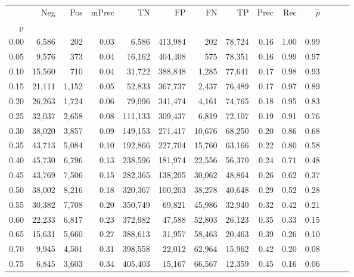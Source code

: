 \begin{tabular}{rrrrrrrrrrrrrr}
\toprule
{} &     Neg &    Pos & mPrec &       TN &       FP &      FN &      TP &  Prec &   Rec & $\hat{p}$ \\
p    &         &        &       &          &          &         &         &       &       &           \\
\midrule
0.00 &   6,586 &    202 &  0.03 &    6,586 &  413,984 &     202 &  78,724 &  0.16 &  1.00 &      0.99 \\
0.05 &   9,576 &    373 &  0.04 &   16,162 &  404,408 &     575 &  78,351 &  0.16 &  0.99 &      0.97 \\
0.10 &  15,560 &    710 &  0.04 &   31,722 &  388,848 &   1,285 &  77,641 &  0.17 &  0.98 &      0.93 \\
0.15 &  21,111 &  1,152 &  0.05 &   52,833 &  367,737 &   2,437 &  76,489 &  0.17 &  0.97 &      0.89 \\
0.20 &  26,263 &  1,724 &  0.06 &   79,096 &  341,474 &   4,161 &  74,765 &  0.18 &  0.95 &      0.83 \\
0.25 &  32,037 &  2,658 &  0.08 &  111,133 &  309,437 &   6,819 &  72,107 &  0.19 &  0.91 &      0.76 \\
0.30 &  38,020 &  3,857 &  0.09 &  149,153 &  271,417 &  10,676 &  68,250 &  0.20 &  0.86 &      0.68 \\
0.35 &  43,713 &  5,084 &  0.10 &  192,866 &  227,704 &  15,760 &  63,166 &  0.22 &  0.80 &      0.58 \\
0.40 &  45,730 &  6,796 &  0.13 &  238,596 &  181,974 &  22,556 &  56,370 &  0.24 &  0.71 &      0.48 \\
0.45 &  43,769 &  7,506 &  0.15 &  282,365 &  138,205 &  30,062 &  48,864 &  0.26 &  0.62 &      0.37 \\
0.50 &  38,002 &  8,216 &  0.18 &  320,367 &  100,203 &  38,278 &  40,648 &  0.29 &  0.52 &      0.28 \\
0.55 &  30,382 &  7,708 &  0.20 &  350,749 &   69,821 &  45,986 &  32,940 &  0.32 &  0.42 &      0.21 \\
0.60 &  22,233 &  6,817 &  0.23 &  372,982 &   47,588 &  52,803 &  26,123 &  0.35 &  0.33 &      0.15 \\
0.65 &  15,631 &  5,660 &  0.27 &  388,613 &   31,957 &  58,463 &  20,463 &  0.39 &  0.26 &      0.10 \\
0.70 &   9,945 &  4,501 &  0.31 &  398,558 &   22,012 &  62,964 &  15,962 &  0.42 &  0.20 &      0.08 \\
0.75 &   6,845 &  3,603 &  0.34 &  405,403 &   15,167 &  66,567 &  12,359 &  0.45 &  0.16 &      0.06 \\

\end{tabular}

